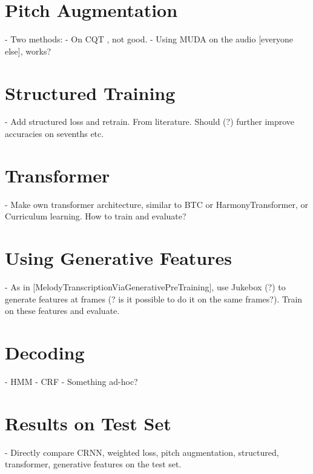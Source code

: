 \section{Pitch Augmentation}
- Two methods:
- On CQT \citet{ACRLargeVocab1}, not good.
- Using MUDA on the audio [everyone else], works?

\section{Structured Training}

- Add structured loss and retrain. From literature. Should (?) further improve accuracies on sevenths etc.

\section{Transformer}

- Make own transformer architecture, similar to BTC or HarmonyTransformer, or Curriculum learning. How to train and evaluate?

\section{Using Generative Features}

- As in [MelodyTranscriptionViaGenerativePreTraining], use Jukebox (?) to generate features at frames (? is it possible to do it on the same frames?). Train on these features and evaluate.

\section{Decoding}\label{sec:decoding}

- HMM
- CRF
- Something ad-hoc?

\section{Results on Test Set}

- Directly compare CRNN, weighted loss, pitch augmentation, structured, transformer, generative features on the test set.